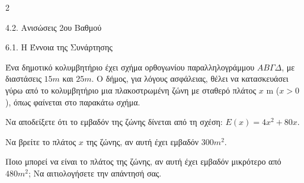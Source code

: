 \begin{ylh}{2}
    \item 4.2. Ανισώσεις 2ου Βαθμού
    \item 6.1. Η Έννοια της Συνάρτησης
\end{ylh}

Ένα δημοτικό κολυμβητήριο έχει σχήμα ορθογωνίου παραλληλογράμμου $AB\Gamma\Delta$, με διαστάσεις $15m$ και $25m$. Ο δήμος, για λόγους ασφάλειας, θέλει να κατασκευάσει γύρω από το κολυμβητήριο μια πλακοστρωμένη ζώνη με σταθερό πλάτος $x$ m ($x > 0$), όπως φαίνεται στο παρακάτω σχήμα.

\begin{center}
\end{center}
\begin{alist}
\item Να αποδείξετε ότι το εμβαδόν της ζώνης δίνεται από τη σχέση: $E(x) = 4x^2 + 80x$.
\item Να βρείτε το πλάτος $x$ της ζώνης, αν αυτή έχει εμβαδόν $300 m^2$.

\item Ποιο μπορεί να είναι το πλάτος της ζώνης, αν αυτή έχει εμβαδόν μικρότερο από $480 m^2$; Να αιτιολογήσετε την απάντησή σας.

\end{alist}

